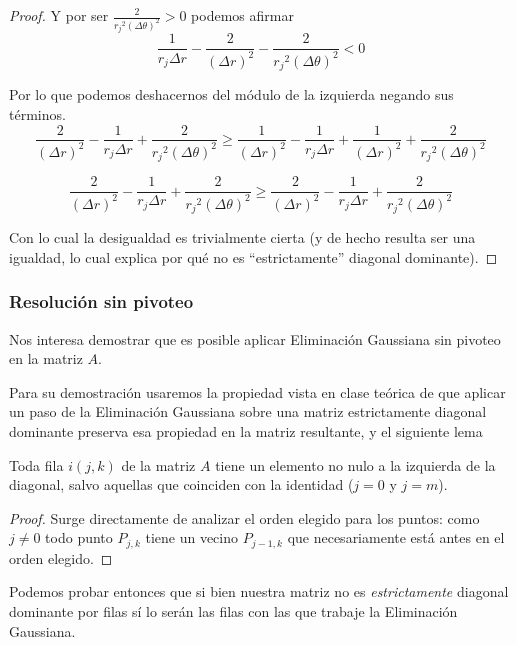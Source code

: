 \begin{proposition}
\begin{proof}
Y por ser $\frac{2}{{r_j}^2 (\Delta \theta)^2} > 0$ podemos afirmar
$$ \frac{1}{r_j \Delta r} - \frac{2}{(\Delta r)^2} - \frac{2}{{r_j}^2 (\Delta \theta)^2} < 0 $$

Por lo que podemos deshacernos del módulo de la izquierda negando sus términos. 
$$\frac{2}{(\Delta r)^2} - \frac{1}{r_j \Delta r} + \frac{2}{{r_j}^2 (\Delta \theta)^2} \geq \frac{1}{(\Delta r)^2} - \frac{1}{r_j \Delta r} + \frac{1}{(\Delta r)^2} + \frac{2}{{r_j}^2(\Delta \theta)^2} $$

$$\frac{2}{(\Delta r)^2} - \frac{1}{r_j \Delta r} + \frac{2}{{r_j}^2 (\Delta \theta)^2} \geq \frac{2}{(\Delta r)^2} - \frac{1}{r_j \Delta r} + \frac{2}{{r_j}^2(\Delta \theta)^2} $$

Con lo cual la desigualdad es trivialmente cierta (y de hecho resulta ser una igualdad, lo cual explica por qué no es ``estrictamente'' diagonal dominante).
\end{proof}
\end{proposition}
\subsubsection{Resolución sin pivoteo}
Nos interesa demostrar que es posible aplicar Eliminación Gaussiana sin pivoteo en la matriz $A$.


Para su demostración usaremos la propiedad vista en clase teórica de que aplicar un paso de la Eliminación Gaussiana sobre una matriz estrictamente diagonal dominante preserva esa propiedad en la matriz resultante, y el siguiente lema
\begin{lemma}\label{izquierda}
 Toda fila $i(j,k)$ de la matriz $A$ tiene un elemento no nulo a la izquierda de la diagonal, salvo aquellas que coinciden con la identidad ($j=0$ y $j=m$).
\end{lemma}
\begin{proof}
Surge directamente de analizar el orden elegido para los puntos: como $j \neq 0$ todo punto $P_{j, k}$ tiene un vecino $P_{j-1,k}$ que necesariamente está antes en el orden elegido.
\end{proof}

Podemos probar entonces que si bien nuestra matriz no es \emph{estrictamente} diagonal dominante por filas sí lo serán las filas con las que trabaje la Eliminación Gaussiana.

